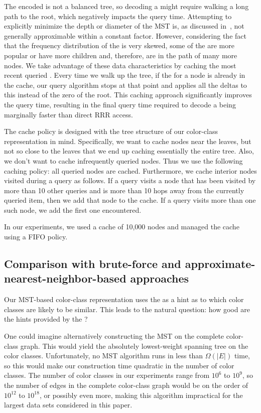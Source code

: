 The encoded \mst is not a balanced tree, so decoding a \cbv might require
walking a long path to the root, which negatively impacts the query time.
Attempting to explicitly minimize the depth or diameter of the MST is, as
discussed in~, not generally approximable within a constant
factor. However, considering the fact that the frequency distribution of
the \ccs is very skewed, some of the \ccs are more popular or have more children
and, therefore, are in the path of many more nodes. We take advantage of these
data characteristics by caching the most recent queried \cbvs. Every time we
walk up the tree, if the \cbv for a node is already in the cache, our query
algorithm stops at that point and applies all the deltas to this \bv instead of
the zero \bv of the root. This caching approach significantly improves the query
time, resulting in the final query time required to decode a \cc being
marginally faster than direct RRR access.

The cache policy is designed with the tree structure of our
color-class representation in mind.  Specifically, we want to cache
nodes near the leaves, but not so close to the leaves that we end up
caching essentially the entire tree.  Also, we don't want to cache
infrequently queried nodes.  Thus we use the following caching policy:
all queried nodes are cached.  Furthermore, we cache interior nodes
visited during a query as follows.  If a query visits a node that
has been visited by more than 10 other queries and is more than
10 hops away from the currently queried item, then we add that node
to the cache.  If a query visits more than one such node, we add
the first one encountered.

In our experiments, we used a cache of 10,000 nodes and managed the
cache using a FIFO policy.

\subsection{Comparison with brute-force and approximate-nearest-neighbor-based approaches}

Our MST-based color-class representation uses the \dbg as a hint as to
which color classes are likely to be similar.  This leads to the
natural question: how good are the hints provided by the \dbg?

One could imagine alternatively constructing the MST on the complete
color-class graph.  This would yield the absolutely lowest-weight
spanning tree on the color classes.  Unfortunately, no MST algorithm
runs in less than $\Omega(|E|)$ time, so this would make our
construction time quadratic in the number of color classes.  The
number of color classes in our experiments range from $10^{6}$ to
$10^9$, so the number of edges in the complete color-class graph would
be on the order of $10^{12}$ to $10^{18}$, or possibly even more,
making this algorithm impractical for the largest data sets considered
in this paper.

